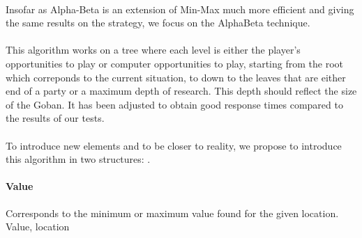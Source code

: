 \documentclass[a4paper,12pt]{report}
\begin{document}
	  \paragraph*{}
	  Insofar as Alpha-Beta is an extension of Min-Max much more efficient and giving the same results on the strategy,
	  we focus on the AlphaBeta technique.
	  \paragraph*{}
	  This algorithm works on a tree where each level is either the player's opportunities to play or computer opportunities to play, starting from the root
	  which correponds to the current situation, to down to the leaves that are either end of a party or a maximum depth of research.
	  This depth should reflect the size of the Goban. It has been adjusted to obtain good response times compared to the results of our tests.
	  \paragraph*{}
	  To introduce new elements and to be closer to reality, we propose to introduce this algorithm in two structures:
.	  \paragraph*{Value}
	  Corresponds to the minimum or maximum value found for the given location.
	  {Value, location}
\end{document}
